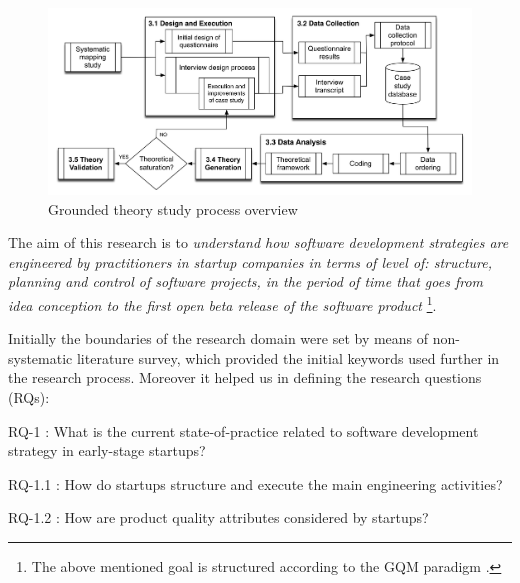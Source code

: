 \documentclass[10pt,journal,letterpaper,compsoc]{IEEEtran}
\begin{document}
\begin{figure}[!t] \centering
\includegraphics[width=5in]{figures/completemethodology2} \caption{Grounded
theory study process overview} \label{fig:gt:completemethodology} \end{figure}

The aim of this research is to \textit{understand how software development
strategies are engineered by practitioners in startup companies in terms of
level of: structure, planning and control of software projects, in the period of
time  that goes from idea conception to the first open beta release of the
software product} \footnote{The above mentioned goal is structured according to
the GQM paradigm \cite{Basili1992}.}.

Initially the boundaries of the research domain were set by means of  non-
systematic literature survey, which provided the initial keywords used  further
in the research process. Moreover it helped us in defining the research
questions (RQs):


\begin{compactitem}

\item RQ-1 : What is the current state-of-practice related to software
development strategy in early-stage startups? 

  \begin{compactitem}
  \item RQ-1.1 : How do startups structure and execute the main engineering
    activities? 
  \item RQ-1.2 : How are product quality attributes considered by
    startups? 
  \end{compactitem}

\end{compactitem}
\end{document}
